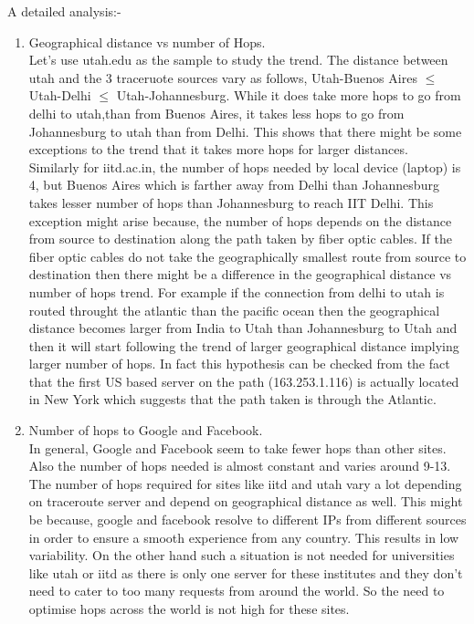 A detailed analysis:-

\begin{enumerate} [1.]
\item Geographical distance vs number of Hops.\\
Let's use utah.edu as the sample to study the trend.
The distance between utah and the 3 traceruote sources vary as follows, Utah-Buenos Aires $\leq$ Utah-Delhi $\leq$ Utah-Johannesburg. 
While it does take more hops to go from delhi to utah,than from Buenos Aires, it takes less hops to go from Johannesburg
to utah than from Delhi. This shows that there might be some exceptions to the trend that it takes more hops for larger distances.\\
Similarly for iitd.ac.in, the number of hops needed by local device (laptop) is 4, but Buenos Aires which is farther away from Delhi 
than Johannesburg takes lesser number of hops than Johannesburg to reach IIT Delhi.
This exception might arise because, the number of hops depends on the distance from source to destination along the path taken by fiber 
optic cables. If the fiber optic cables do not take the geographically smallest route from source to destination then there might be a 
difference in the geographical distance vs number of hops trend. For example if the connection from delhi to utah is routed throught 
the atlantic than the pacific ocean then the geographical distance becomes larger from India to Utah than Johannesburg to Utah and then 
it will start following the trend of larger geographical distance implying larger number of hops.
In fact this hypothesis can be checked from the fact that the first US based server on the path (163.253.1.116) is actually located in 
New York which suggests that the path taken is through the Atlantic.
\item Number of hops to Google and Facebook.\\
In general, Google and Facebook seem to take fewer hops than other sites. Also the number of hops needed is almost constant and varies
around 9-13. 
The number of hops required for sites like iitd and utah vary a lot depending on traceroute server and depend on geographical distance
as well.
This might be because, google and facebook resolve to different IPs from different sources in order to ensure a smooth experience from
any country. This results in low variability. On the other hand such a situation is not needed for universities like utah or iitd as 
there is only one server for these institutes and they don't need to cater to too many requests from around the world. So the need 
to optimise hops across the world is not high for these sites.
\end{enumerate}

